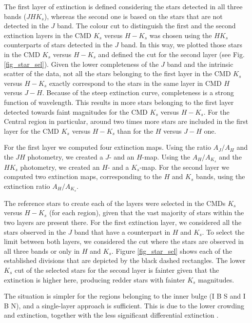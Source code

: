 \documentclass{aa}
\begin{document}
The first layer of extinction is defined considering the stars detected in all three bands ($JHK_s$), whereas the second one is based on the stars that are not detected in the $J$ band. The colour cut to distinguish the first and the second extinction layers in the CMD $K_s$ versus $H-K_s$ was chosen using the $HK_s$ counterparts of stars detected in the $J$ band. In this way, we plotted those stars in the CMD $K_s$ versus $H-K_s$ and defined the cut for the second layer (see Fig.\,\ref{fig_star_sel}). Given the lower completeness of the $J$ band and the intrinsic scatter of the data, not all the stars belonging to the first layer in the CMD $K_s$ versus $H-K_s$ exactly correspond to the stars in the same layer in CMD $H$ versus $J-H$. Because of the steep extinction curve, completeness is a strong function of wavelength. This results in more stars belonging to the first layer detected towards faint magnitudes for the CMD $K_s$ versus $H-K_s$. For the Central region in particular, around two times more stars are included in the first layer for the CMD $K_s$ versus $H-K_s$ than for the $H$ versus $J-H$ one. 


For the first layer we computed four extinction maps. Using the ratio $A_J/A_H$ and the $JH$ photometry, we created a $J$- and an $H$-map. Using the $A_H/A_{K_s}$ and the $HK_s$ photometry, we created an $H$- and a $K_s$-map. For the second layer we computed two extinction maps, corresponding to the $H$ and $K_s$ bands, using the extinction ratio $A_H/A_{K_s}$.


The reference stars to create each of the layers were selected in the CMDs $K_s$ versus $H-K_s$ (for each region), given that the vast majority of stars within the two layers are present there. For the first extinction layer, we considered all the stars observed in the $J$ band that have a counterpart in $H$ and $K_s$. To select the limit between both layers, we considered the cut where the stars are observed in all three bands or only in $H$ and $K_s$. Figure \ref{fig_star_sel} shows each of the established divisions that are depicted by the black dashed rectangles. The lower $K_s$ cut of the selected stars for the second layer is fainter given that the extinction is higher here, producing redder stars with fainter $K_s$ magnitudes.


The situation is simpler for the regions belonging to the inner bulge (I B S and I B N), and a single-layer approach is sufficient. This is due to the lower crowding and extinction, together with the less significant differential extinction \citep[e.g.][]{Nogueras-Lara:2018ab,Nogueras-Lara:2020aa}.
\end{document}
